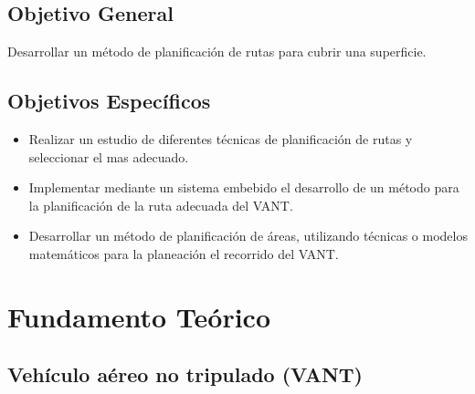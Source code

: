 \documentclass[]{report}
\begin{document}
\section{Objetivo General}
Desarrollar un método de planificación de rutas para cubrir una superficie.
\section{Objetivos Específicos}
\begin{itemize}
	\item Realizar un estudio de diferentes técnicas de planificación de rutas y seleccionar el mas adecuado.
	\item Implementar mediante un sistema embebido  el desarrollo de un método para la planificación de la ruta adecuada del VANT.
	\item Desarrollar un método de planificación de áreas, utilizando técnicas o modelos matemáticos para la planeación el recorrido del VANT.
	
\end{itemize}


\chapter{Fundamento Teórico}
\section{Vehículo aéreo no tripulado (VANT)}
\end{document}
